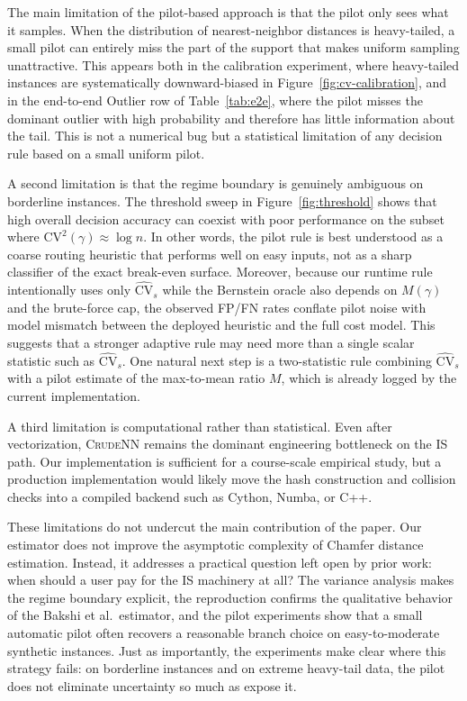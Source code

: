 \documentclass[conference]{IEEEtran}
\begin{document}
The main limitation of the pilot-based approach is that the pilot only
sees what it samples. When the distribution of nearest-neighbor
distances is heavy-tailed, a small pilot can entirely miss the part of
the support that makes uniform sampling unattractive. This appears both
in the calibration experiment, where heavy-tailed instances are
systematically downward-biased in Figure~\ref{fig:cv-calibration}, and
in the end-to-end Outlier row of Table~\ref{tab:e2e}, where the pilot
misses the dominant outlier with high probability and therefore has
little information about the tail. This is not a numerical bug but a
statistical limitation of any decision rule based on a small uniform
pilot.

A second limitation is that the regime boundary is genuinely ambiguous
on borderline instances. The threshold sweep in
Figure~\ref{fig:threshold} shows that high overall decision accuracy can
coexist with poor performance on the subset where
$\mathrm{CV}^2(\gamma) \approx \log n$. In other words, the pilot rule
is best understood as a coarse routing heuristic that performs well on
easy inputs, not as a sharp classifier of the exact break-even surface.
Moreover, because our runtime rule intentionally uses only
$\widehat{\mathrm{CV}}_s$ while the Bernstein oracle also depends on
$M(\gamma)$ and the brute-force cap, the observed FP/FN rates conflate
pilot noise with model mismatch between the deployed heuristic and the
full cost model.
This suggests that a stronger adaptive rule may need more than a single
scalar statistic such as $\widehat{\mathrm{CV}}_s$. One natural next
step is a two-statistic rule combining $\widehat{\mathrm{CV}}_s$ with a
pilot estimate of the max-to-mean ratio $M$, which is already logged by
the current implementation.

A third limitation is computational rather than statistical. Even after
vectorization, \textsc{CrudeNN} remains the dominant engineering
bottleneck on the IS path. Our implementation is sufficient for a
course-scale empirical study, but a production implementation would
likely move the hash construction and collision checks into a compiled
backend such as Cython, Numba, or C++.

These limitations do not undercut the main contribution of the paper.
Our estimator does not improve the asymptotic complexity of Chamfer
distance estimation. Instead, it addresses a practical question left
open by prior work: when should a user pay for the IS machinery at all?
The variance analysis makes the regime boundary explicit, the
reproduction confirms the qualitative behavior of the Bakshi et al.\
estimator, and the pilot experiments show that a small automatic pilot
often recovers a reasonable branch choice on easy-to-moderate
synthetic instances. Just as importantly, the experiments make clear
where this strategy fails: on borderline instances and on extreme
heavy-tail data, the pilot does not eliminate uncertainty so much as
expose it.
\end{document}

